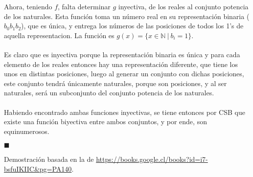 \documentclass[letter]{article}
\begin{document}
\begin{pregunta}{2}
\begin{enumerate}
		Ahora, teniendo $f$, falta determinar $g$ inyectiva, de los reales al conjunto potencia de los naturales. Esta función toma un número real en su representación binaria ($b_0b_1b_2$), que es única, y entrega los números de las posiciones de todos los 1's de aquella representacion. La función es $g(x)=\{x\in\mathbb{N}\ |\ b_i = 1\}$.\\\\
		Es claro que es inyectiva porque la representación binaria es única y para cada elemento de los reales entonces hay una representación diferente, que tiene los unos en distintas posiciones, luego al generar un conjunto con dichas posiciones, este conjunto tendrá únicamente naturales, porque son posiciones, y al ser naturales, será un subconjunto del conjunto potencia de los naturales.\\\\
		Habiendo encontrado ambas funciones inyectivas, se tiene entonces por CSB que existe una función biyectiva entre ambos conjuntos, y por ende, son equinumerosos.
		\begin{flushright}$\blacksquare$\end{flushright}
		Demostración basada en la de \url{https://books.google.cl/books?id=i7-bsfuIKIIC&pg=PA140}. 
		
		\end{enumerate}

	\end{pregunta}
\end{document}
